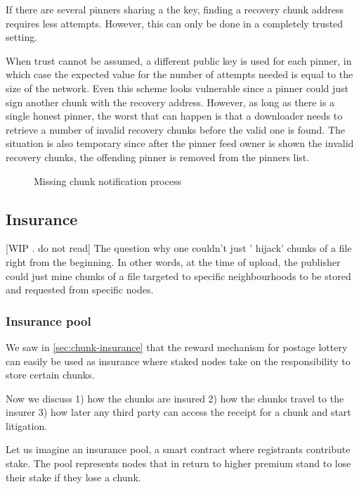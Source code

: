 If there are several pinners sharing a the key, finding a recovery chunk address requires less attempts. However, this can only be done in a completely  trusted setting.

When trust cannot be assumed, a different public key is used for each pinner, in which case the expected value for the number of attempts needed is equal to the size of the network. 
Even this scheme looks vulnerable since a pinner could just sign another chunk with the recovery address. However, as long as there  is a single honest pinner, the worst that can happen is that a downloader needs to retrieve a number of invalid recovery chunks  before the valid one is found. The situation is also temporary since after the pinner feed owner is shown the invalid recovery chunks, the  offending pinner is removed from the pinners list.


\begin{figure}[htbp]
  \centering
  \caption[Missing chunk notification process]{Missing chunk notification process}
  \label{fig:missing-chunk-notification}
\end{figure}




\subsection{Insurance}\label{sec:insurance}
 
[WIP . do not read]
The question why one couldn't just ' hijack' chunks of a file right from the beginning. In other words, at the time of upload, the publisher could just mine chunks of a file targeted to specific neighbourhoods to be stored and requested from specific nodes. 


\subsubsection{Insurance pool}
We saw in \ref{sec:chunk-insurance} that the reward mechanism for postage lottery can easily be used as insurance where staked nodes take on the responsibility to store certain chunks. 

Now we discuss  1) how the chunks are insured 2) how the chunks travel to the insurer 3) how later any third party can access the receipt for a chunk and start litigation.

Let us imagine an insurance pool, a smart contract where registrants contribute stake. The pool represents nodes that in return to higher premium stand to lose their stake if they lose a chunk. 

